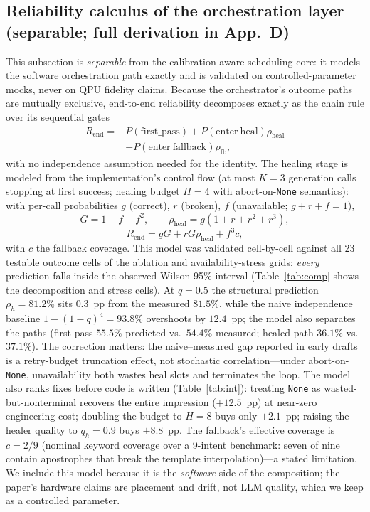 \documentclass[journal,10pt,twocolumn]{IEEEtran}
\begin{document}
\subsection{Reliability calculus of the orchestration layer (separable; full derivation in App.~D)}
\label{sec:calculus}
This subsection is \emph{separable} from the calibration-aware scheduling core: it models the software
orchestration path exactly and is validated on controlled-parameter mocks, never on QPU fidelity claims.
Because the orchestrator's outcome paths are mutually exclusive, end-to-end reliability decomposes exactly as the
chain rule over its sequential gates
\begin{equation}\begin{split}
R_{\mathrm{end}}={}&P(\mathrm{first\_pass})+P(\mathrm{enter\ heal})\rho_{\mathrm{heal}}\\
&+P(\mathrm{enter\ fallback})\rho_{\mathrm{fb}},
\end{split}\label{eq:composition}
\end{equation}
with no independence assumption needed for the identity. The healing stage is modeled from the implementation's
control flow (at most $K{=}3$ generation calls stopping at first success; healing budget $H{=}4$ with
abort-on-\texttt{None} semantics): with per-call probabilities $g$ (correct), $r$ (broken), $f$ (unavailable;
$g{+}r{+}f{=}1$),
\begin{equation}
G=1+f+f^{2},\qquad \rho_{\mathrm{heal}}=g(1+r+r^{2}+r^{3}),
\label{eq:gamel}
\end{equation}
\begin{equation}
R_{\mathrm{end}}=gG+rG\rho_{\mathrm{heal}}+f^{3}c,
\label{eq:rheal}
\end{equation}
with $c$ the fallback coverage. This model was validated cell-by-cell against all 23 testable outcome cells of the
ablation and availability-stress grids: \emph{every} prediction falls inside the observed Wilson 95\% interval
(Table~\ref{tab:comp} shows the decomposition and stress cells). At $q{=}0.5$ the structural prediction
$\rho_h{=}81.2\%$ sits $0.3$~pp from the measured $81.5\%$, while the naive independence baseline
$1-(1-q)^{4}{=}93.8\%$ overshoots by $12.4$~pp; the model also separates the paths (first-pass $55.5\%$
predicted vs.\ $54.4\%$ measured; healed path $36.1\%$ vs.\ $37.1\%$). The correction matters: the
naive--measured gap reported in early drafts is a retry-budget truncation effect, not stochastic
correlation---under abort-on-\texttt{None}, unavailability both wastes heal slots and terminates the loop.
The model also ranks fixes before code is written (Table~\ref{tab:int}): treating \texttt{None} as
wasted-but-nonterminal recovers the entire impression ($+12.5$~pp) at near-zero engineering cost; doubling the
budget to $H{=}8$ buys only $+2.1$~pp; raising the healer quality to $q_h{=}0.9$ buys $+8.8$~pp. The fallback's
effective coverage is $c{=}2/9$ (nominal keyword coverage over a 9-intent benchmark: seven of nine contain
apostrophes that break the template interpolation)---a stated limitation. We include this model because it is the
\emph{software} side of the composition; the paper's hardware claims are placement and drift, not LLM quality,
which we keep as a controlled parameter.
\end{document}
